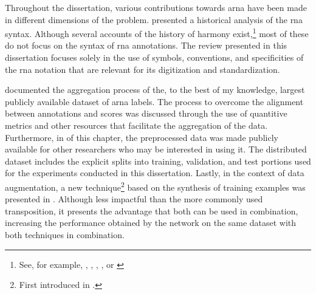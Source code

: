
Throughout the dissertation, various contributions towards
\gls{arna} have been made in different dimensions of the
problem. 
presented a historical analysis of the \gls{rna} syntax.
Although several accounts of the history of harmony
exist,\footnote{See, for example,
\textcite{wason1985viennese}, \textcite{grave1988praise},
\textcite{christensen2002tonality},
\textcite{laitz2010graduate}, or
\textcite{sansallovich2013quintas}} most of these do not
focus on the syntax of \gls{rna} annotations. The review
presented in this dissertation focuses solely in the use of
symbols, conventions, and specificities of the \gls{rna}
notation that are relevant for its digitization and
standardization.

 documented the
aggregation process of the, to the best of my knowledge,
largest publicly available dataset of \gls{arna} labels.
The process to overcome the alignment between annotations
and scores was discussed through the use of quantitive
metrics and other resources that facilitate the aggregation
of the data. Furthermore, in  of
this chapter, the preprocessed data was made publicly
available for other researchers who may be interested in
using it. The distributed dataset includes the explicit
splits into training, validation, and test portions used for
the experiments conducted in this dissertation. Lastly, in
the context of data augmentation, a new
technique\footnote{First introduced in
\textcite{napoleslopez2021augmentednet}.} based on the
synthesis of training examples was presented in
. Although less
impactful than the more commonly used transposition, it
presents the advantage that both can be used in combination,
increasing the performance obtained by the network on the
same dataset with both techniques in combination.

